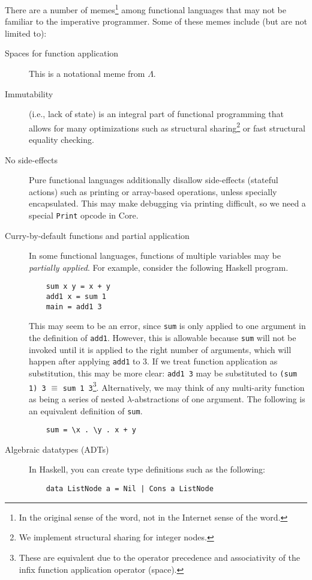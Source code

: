 There are a number of memes\footnote{In the original sense of the word, not in the Internet sense of the word.} among functional languages that may not be familiar to the imperative programmer. Some of these memes include (but are not limited to):
\begin{description}
\item[Spaces for function application] This is a notational meme from $\Lambda$.
\item[Immutability] (i.e., lack of state) is an integral part of functional programming that allows for many optimizations such as structural sharing\footnote{We implement structural sharing for integer nodes.} or fast structural equality checking.
\item[No side-effects] Pure functional languages additionally disallow side-effects (stateful actions) such as printing or array-based operations, unless specially encapsulated. This may make debugging via printing difficult, so we need a special \texttt{Print} opcode in Core.
\item[Curry-by-default functions and partial application] In some functional languages, functions of multiple variables may be \textit{partially applied}. For example, consider the following Haskell program.
  \begin{verbatim}
    sum x y = x + y
    add1 x = sum 1
    main = add1 3
  \end{verbatim}
  This may seem to be an error, since \texttt{sum} is only applied to one argument in the definition of \texttt{add1}. However, this is allowable because \texttt{sum} will not be invoked until it is applied to the right number of arguments, which will happen after applying \texttt{add1} to 3. If we treat function application as substitution, this may be more clear: \texttt{add1 3} may be substituted to \texttt{(sum 1) 3} $\equiv$ \texttt{sum 1 3}\footnote{These are equivalent due to the operator precedence and associativity of the infix function application operator (space).}. Alternatively, we may think of any multi-arity function as being a series of nested $\lambda$-abstractions of one argument. The following is an equivalent definition of \texttt{sum}.
  \begin{verbatim}
    sum = \x . \y . x + y
  \end{verbatim}
\item[Algebraic datatypes (ADTs)] In Haskell, you can create type definitions such as the following:
  \begin{verbatim}
    data ListNode a = Nil | Cons a ListNode

\end{verbatim}
\end{description}

